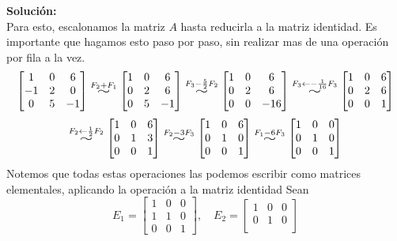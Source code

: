 \documentclass[12pt]{article}
\newenvironment{solucion}
{\begin{mdframed}[backgroundcolor=black!10]
		{\bf Solución:}\\
	}
	{
	\end{mdframed}
}
\newenvironment{preguntas}
{\begin{enumerate}\itemsep12pt
	}
	{
	\end{enumerate}
}
\newcommand{\widesim}[2][1.5]{
	\mathrel{\overset{#2}{\scalebox{#1}[1]{$\sim$}}}
}
\begin{document}
\begin{preguntas}
\begin{solucion}
Para esto, escalonamos la matriz $A$ hasta reducirla a la matriz identidad. Es importante que hagamos esto paso por paso, sin realizar mas de una operación por fila a la vez.
		$$\begin{bmatrix}
		1 & 0 & 6\\
		-1 & 2 & 0\\
		0 & 5 & -1
		\end{bmatrix} \widesim{F_2+F_1}
		\begin{bmatrix}
		1 & 0 & 6\\
		0 & 2 & 6\\
		0 & 5 & -1
		\end{bmatrix} \widesim{F_3-\frac{5}{2}F_2}
		\begin{bmatrix}
		1 & 0 & 6\\
		0 & 2 & 6\\
		0 & 0 & -16
		\end{bmatrix} \widesim{F_3 \leftarrow -\frac{1}{16}F_3}
		\begin{bmatrix}
		1 & 0 & 6\\
		0 & 2 & 6\\
		0 & 0 & 1
		\end{bmatrix}$$
		$$\widesim{F_2 \leftarrow \frac{1}{2}F_2}
		\begin{bmatrix}
		1 & 0 & 6\\
		0 & 1 & 3\\
		0 & 0 & 1
		\end{bmatrix} \widesim{F_2 - 3F_3}
		\begin{bmatrix}
		1 & 0 & 6\\
		0 & 1 & 0\\
		0 & 0 & 1
		\end{bmatrix} \widesim{F_1 - 6F_3}
		\begin{bmatrix}
		1 & 0 & 0\\
		0 & 1 & 0\\
		0 & 0 & 1
		\end{bmatrix}$$
		Notemos que todas estas operaciones las podemos escribir como matrices elementales, aplicando la operación a la matriz identidad Sean
		$$E_1 = \begin{bmatrix}
		1 & 0 & 0\\
		1 & 1 & 0\\
		0 & 0 & 1
		\end{bmatrix}, \quad E_2 = \begin{bmatrix}
		1 & 0 & 0\\
		0 & 1 & 0\\

\end{bmatrix}$$
\end{solucion}
\end{preguntas}
\end{document}
